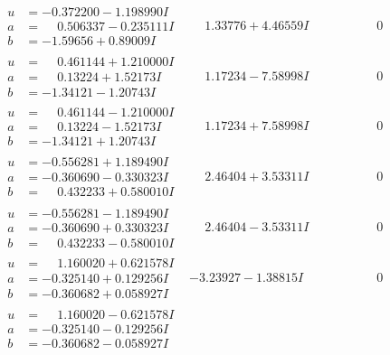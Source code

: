 \documentclass[1p]{elsarticle_modified}
\theoremstyle{definition}
\begin{document}
$$\begin{array}{c|c|c}
\begin{aligned}
u &= -0.372200 - 1.198990 I \\
a &= \phantom{-}0.506337 - 0.235111 I \\
b &= -1.59656 + 0.89009 I\end{aligned}
 & \phantom{-}1.33776 + 4.46559 I & \phantom{-0.000000 } 0 \\ \hline\begin{aligned}
u &= \phantom{-}0.461144 + 1.210000 I \\
a &= \phantom{-}0.13224 + 1.52173 I \\
b &= -1.34121 - 1.20743 I\end{aligned}
 & \phantom{-}1.17234 - 7.58998 I & \phantom{-0.000000 } 0 \\ \hline\begin{aligned}
u &= \phantom{-}0.461144 - 1.210000 I \\
a &= \phantom{-}0.13224 - 1.52173 I \\
b &= -1.34121 + 1.20743 I\end{aligned}
 & \phantom{-}1.17234 + 7.58998 I & \phantom{-0.000000 } 0 \\ \hline\begin{aligned}
u &= -0.556281 + 1.189490 I \\
a &= -0.360690 - 0.330323 I \\
b &= \phantom{-}0.432233 + 0.580010 I\end{aligned}
 & \phantom{-}2.46404 + 3.53311 I & \phantom{-0.000000 } 0 \\ \hline\begin{aligned}
u &= -0.556281 - 1.189490 I \\
a &= -0.360690 + 0.330323 I \\
b &= \phantom{-}0.432233 - 0.580010 I\end{aligned}
 & \phantom{-}2.46404 - 3.53311 I & \phantom{-0.000000 } 0 \\ \hline\begin{aligned}
u &= \phantom{-}1.160020 + 0.621578 I \\
a &= -0.325140 + 0.129256 I \\
b &= -0.360682 + 0.058927 I\end{aligned}
 & -3.23927 - 1.38815 I & \phantom{-0.000000 } 0 \\ \hline\begin{aligned}
u &= \phantom{-}1.160020 - 0.621578 I \\
a &= -0.325140 - 0.129256 I \\
b &= -0.360682 - 0.058927 I\end{aligned}

\end{array}$$
\end{document}
